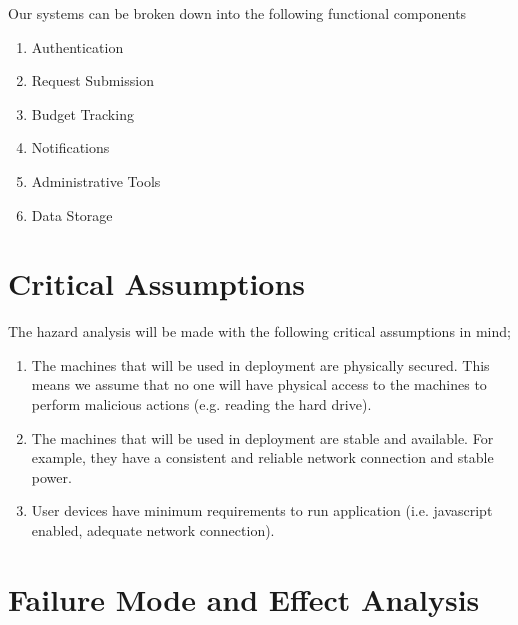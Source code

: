 \documentclass{article}
\begin{document}
Our systems can be broken down into the following functional components
\begin{enumerate}
    \item Authentication
    \item Request Submission
    \item Budget Tracking
    \item Notifications
    \item Administrative Tools
    \item Data Storage
\end{enumerate}

\section{Critical Assumptions}

The hazard analysis will be made with the following critical assumptions in mind;
\begin{enumerate}
    \item The machines that will be used in deployment are physically secured. This means we assume that no one will have physical access to the machines to perform malicious actions (e.g. reading the hard drive).
    \item The machines that will be used in deployment are stable and available. For example, they have a consistent and reliable network connection and stable power.
    \item User devices have minimum requirements to run application (i.e. javascript enabled, adequate network connection).
\end{enumerate}

\section{Failure Mode and Effect Analysis}
\end{document}
